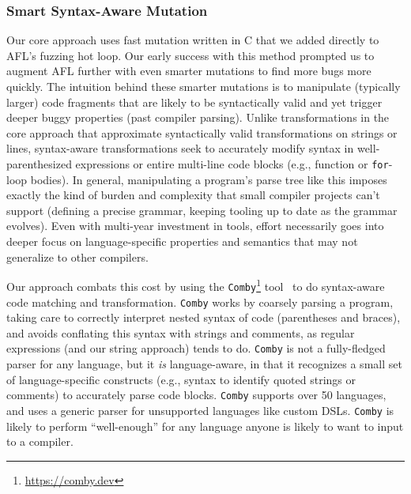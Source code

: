 \subsubsection{Smart Syntax-Aware Mutation}
\label{strat-syntax-aware}

\begin{sloppypar}
Our core approach uses fast mutation written in C that we added directly to
AFL's fuzzing hot loop. Our early success with this method prompted us to
augment AFL further with even smarter mutations to find more bugs more quickly.
The intuition behind these smarter mutations is to manipulate (typically
larger) code fragments that are likely to be syntactically valid and yet
trigger deeper buggy properties (past compiler parsing). Unlike transformations
in the core approach that approximate syntactically valid transformations on
strings or lines, syntax-aware transformations seek to accurately modify syntax
in well-parenthesized expressions or entire multi-line code blocks (e.g.,
function or \texttt{for}-loop bodies). In general, manipulating a program's
parse tree like this imposes exactly the kind of burden and complexity that
small compiler projects can't support (defining a precise grammar, keeping
tooling up to date as the grammar evolves). Even with multi-year investment in
tools, effort necessarily goes into deeper focus on
language-specific properties and semantics %
that may not generalize to other compilers.
\end{sloppypar}

\begin{sloppypar}
Our approach combats this cost by using the
\texttt{Comby}\footnote{\href{https://comby.dev}{https://comby.dev}} tool~\cite{combypaper} to do
syntax-aware code matching and transformation. \texttt{Comby} works by coarsely
parsing a program, taking care to correctly interpret nested syntax of code
(parentheses and braces), and avoids conflating this syntax with strings and
comments, as regular expressions (and our string approach) tends to do.  \texttt{Comby} is not a fully-fledged
parser for any language, but it \emph{is} language-aware, in that it recognizes
a small set of language-specific constructs (e.g., syntax to identify quoted
strings or comments) to accurately parse code blocks. \texttt{Comby} supports
over 50 languages, and uses a generic parser for unsupported languages like custom
DSLs. \texttt{Comby} is likely to perform ``well-enough'' for any language
anyone is likely to want to input to a compiler.
\end{sloppypar}

